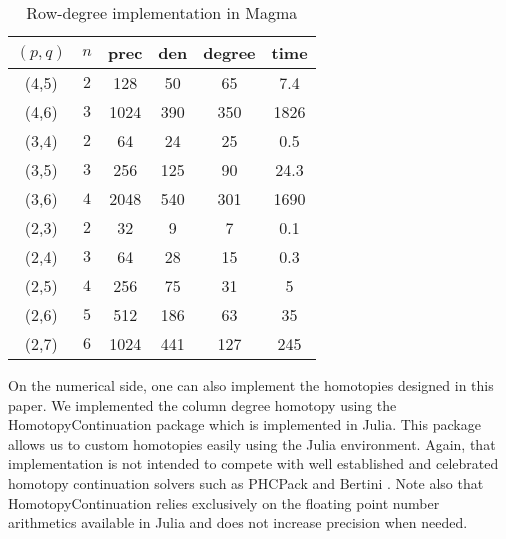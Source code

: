 \documentclass[amsthm]{elsart}
\begin{document}
\begin{center}
\begin{table}[h]
  \centering
  \begin{tabular}[]{cc|ccc|c}
    $(p,q)$ & $n$ & {\sf prec} & {\sf den} & {\sf degree} & {\sf time} \\
    \hline
    (4,5)   & $2$ &  128 &  50 &   65   &  7.4\\
    (4,6)   & $3$ & 1024 & 390 &  350   &1826 \\
    \hline
    (3,4)   & $2$ &   64 &  24 &   25   & 0.5 \\
    (3,5)   & $3$ &  256 & 125 &   90   & 24.3\\
    (3,6)   & $4$ & 2048 & 540 &  301   & 1690\\
    \hline
    (2,3)   & $2$ &  32  &   9 &    7   &  0.1\\
    (2,4)   & $3$ &  64  &  28 &   15   &  0.3\\
    (2,5)   & $4$ & 256  &  75 &   31   &    5\\
    (2,6)   & $5$ & 512  & 186 &   63   &   35\\
    (2,7)   & $6$ & 1024 & 441 &  127   &  245\\
    \hline
  \end{tabular}
  \smallskip
  \caption{Row-degree implementation in {\sf Magma}}    
  \label{tab:implem:rdeg}
\end{table}  
\end{center}





On the numerical side, one can also implement the homotopies designed in this
paper. We implemented the column degree homotopy using the {\sf
  HomotopyContinuation} package \cite{HomContJulia} which is implemented in {\sf
  Julia}. This package allows us to custom homotopies easily using the {\sf
  Julia} environment. Again, that implementation is not intended to compete with
well established and celebrated homotopy continuation solvers such as {\sf
  PHCPack} \cite{PHCPack} and {\sf Bertini} \cite{Bertini}. Note also that {\sf
  HomotopyContinuation} relies exclusively on the floating point number
arithmetics available in {\sf Julia} and does not increase precision when
needed.
\end{document}
